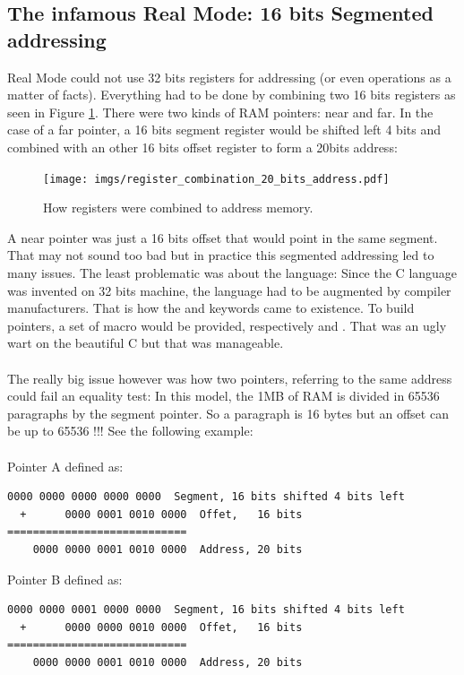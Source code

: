 \documentclass[book.tex]{subfiles}
\begin{document}
\subsection{The infamous Real Mode: 16 bits Segmented addressing}
Real Mode could not use 32 bits registers for addressing (or even operations as a matter of facts). Everything had to be done by combining two 16 bits registers as seen in Figure \ref{fig:register_comb_to_20_bits}. There were two kinds of RAM pointers: near and far. In the case of a far pointer, a 16 bits segment register would be shifted left 4 bits and combined with an other 16 bits offset register to form a 20bits address:\\
\begin{figure}[H]
\centering
\texttt{[image: imgs/register\_combination\_20\_bits\_address.pdf]}
\caption{How registers were combined to address memory.}
\label{fig:register_comb_to_20_bits}
\end{figure}
A near pointer was just a 16 bits offset that would point in the same segment. That may not sound too bad but in practice this segmented addressing led to many issues. The least problematic was about the language: Since the C language was invented on 32 bits machine, the language had to be augmented by compiler manufacturers. That is how the  and  keywords came to existence. To build pointers, a set of macro would be provided, respectively  and . That was an ugly wart on the beautiful C but that was manageable.\\
\\
The really big issue however was how two pointers, referring to the same address could fail an equality test: In this model, the 1MB of RAM is divided in 65536 paragraphs by the segment pointer. So a paragraph is 16 bytes but an offset can be up to 65536 !!! See the following example:\\
\bigskip
\\Pointer A defined as:
\begin{Verbatim}[fontsize=\relsize{-1}]
    0000 0000 0000 0000 0000  Segment, 16 bits shifted 4 bits left  
  +      0000 0001 0010 0000  Offet,   16 bits
============================
    0000 0000 0001 0010 0000  Address, 20 bits
\end{Verbatim}

\bigskip

Pointer B defined as:
\begin{Verbatim}[fontsize=\relsize{-1}]
    0000 0000 0001 0000 0000  Segment, 16 bits shifted 4 bits left  
  +      0000 0000 0010 0000  Offet,   16 bits
============================
    0000 0000 0001 0010 0000  Address, 20 bits
\end{Verbatim}
\end{document}

